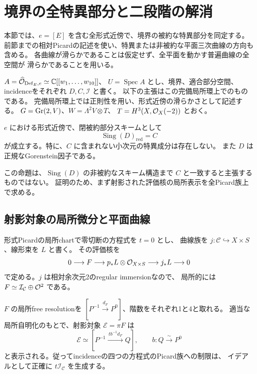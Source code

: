 \clearpage
\section{境界の全特異部分と二段階の解消}
\label{sec:global-bn-singular}

本節では、$e=[E]$ を含む全形式近傍で、境界の被約な特異部分を同定する。
前節までの相対Picardの記述を使い、特異または非被約な平面三次曲線の方向も含める。
各曲線が滑らかであることは仮定せず、全平面を動かす普遍曲線の全空間が
滑らかであることを用いる。

$A=\widehat{\mathcal O}_{\operatorname{Def}_E,e}\simeq\mathbb C[[w_1,\ldots,w_{10}]]$、
$U=\operatorname{Spec}A$ とし、境界、適合部分空間、incidenceをそれぞれ
$D,C,\mathcal I$ と書く。
以下の主張はこの完備局所環上でのものである。
完備局所環上では正則性を用い、形式近傍の滑らかさとして記述する。
$G=\operatorname{Gr}(2,V)$、$W=\Lambda^2V\otimes T$、
$T=H^3(X,\mathcal O_X(-2))$ とおく。

\begin{theorem}[境界の全特異部分]\label{thm:global-bn-singular}
$e$ における形式近傍で、閉被約部分スキームとして
\[
 \operatorname{Sing}(D)_{\mathrm{red}}=C
\]
が成立する。特に、$C$ に含まれない小次元の特異成分は存在しない。
また $D$ は正規なGorenstein因子である。
\end{theorem}

この命題は、$\operatorname{Sing}(D)$ の非被約なスキーム構造まで
$C$ と一致すると主張するものではない。
証明のため、まず射影された評価核の局所表示を全Picard族上で求める。

\subsection{射影対象の局所微分と平面曲線}

形式Picardの局所chartで零切断の方程式を $t=0$ とし、
曲線族を $j:\mathscr C\hookrightarrow X\times S$、線形束を $L$ と書く。
その評価核を
\[
 0\longrightarrow F\longrightarrow p_*L\otimes\mathcal O_{X\times S}
 \longrightarrow j_*L\longrightarrow0
\]
で定める。$j$ は相対余次元2のregular immersionなので、
局所的には $F\simeq\mathcal I_{\mathcal C}\oplus\mathcal O^2$ である。

\begin{lemma}[Picard族の局所行列]\label{lem:picard-local-matrix}
$F$ の局所free resolutionを
$[P^{-1}\xrightarrow{d_F}P^0]$、階数をそれぞれ1と4と取れる。
適当な局所自明化のもとで、射影対象 $\mathcal E=\pi F$ は
\begin{equation}\label{eq:picard-local-matrix}
 \mathcal E\simeq
 [P^{-1}\xrightarrow{\,t b^{-1}d_F\,}Q],
 \qquad b:Q\xrightarrow{\sim}P^0
\end{equation}
と表示される。従ってincidenceの四つの方程式のPicard族への制限は、
イデアルとして正確に $t\mathcal I_{\mathscr C}$ を生成する。
\end{lemma}

